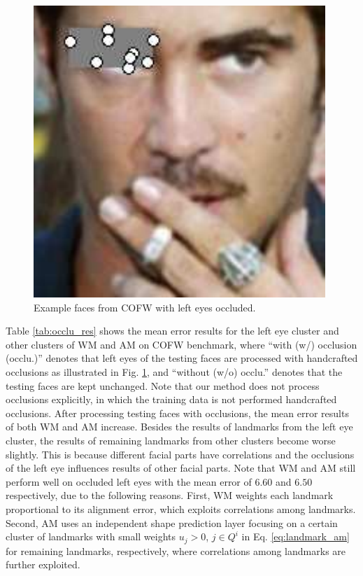 \documentclass[journal]{IEEEtran}
\begin{document}
\begin{figure}[!htb]
\includegraphics[scale=0.25]{415_occlu}
\caption{Example faces from COFW with left eyes occluded.}
\label{fig:occlu_examples}
\end{figure}

Table \ref{tab:occlu_res} shows the mean error results for the left eye cluster and other clusters of WM and AM on COFW benchmark, where ``with (w/) occlusion (occlu.)'' denotes that left eyes of the testing faces are processed with handcrafted occlusions as illustrated in Fig. \ref{fig:occlu_examples}, and ``without (w/o) occlu.'' denotes that the testing faces are kept unchanged. Note that our method does not process occlusions explicitly, in which the training data is not performed handcrafted occlusions. After processing testing faces with occlusions, the mean error results of both WM and AM increase. Besides the results of landmarks from the left eye cluster, the results of remaining landmarks from other clusters become worse slightly. This is because different facial parts have correlations and the occlusions of the left eye influences results of other facial parts. Note that WM and AM still perform well on occluded left eyes with the mean error of $6.60$ and $6.50$ respectively, due to the following reasons. First, WM weights each landmark proportional to its alignment error, which exploits correlations among landmarks. Second, AM uses an independent shape prediction layer focusing on a certain cluster of landmarks with small weights $u_j>0$, $j\in Q^{i}$ in Eq. \ref{eq:landmark_am} for remaining landmarks, respectively, where correlations among landmarks are further exploited.
\end{document}
